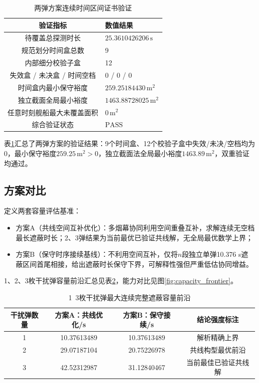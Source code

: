\documentclass[withoutpreface,bwprint]{cumcmthesis}
\renewcommand{\textbf}[1]{{\song\bfseries #1}}
\begin{document}
\begin{table}[htbp]
	\centering
	\caption{两弹方案连续时间区间证书验证}
	\label{tab:two_bomb_cert}
	\begin{tabular}{c|l}
		\hline
		\textbf{验证指标} & \textbf{数值结果} \\
		\hline
		待覆盖总探测时长 & $25.3610426206\,\text{s}$ \\
		规范划分时间盒总数 & 9 \\
		内部细分校验子盒 & 12 \\
		失效盒 / 未决盒 / 时间空档 & 0 / 0 / 0 \\
		时间盒内最小保守裕度 & $259.25184430\,\text{m}^2$ \\
		独立截面全局最小裕度 & $1463.88728025\,\text{m}^2$ \\
		任意时刻舰船最大未覆盖面积 & $0\,\text{m}^2$ \\
		综合验证状态 & $\text{PASS}$ \\
		\hline
	\end{tabular}
\end{table}


	
表\ref{tab:two_bomb_cert}汇总了两弹方案的验证结果：9个时间盒、12个校验子盒中失效/未决/空档均为0，最小保守裕度$259.25\,\text{m}^2>0$，独立截面法全局最小裕度$1463.89\,\text{m}^2$，双重验证均通过。


\subsection{方案对比}
定义两套容量评估基准：
\begin{itemize}
	\item 方案A（共线空间互补优化）：多烟幕协同利用空间重叠互补，求解连续无空档最长遮蔽时长；2、3弹结果为当前最优已验证共线解，无全局最优数学上界；
	\item 方案B（保守时序接续基线）：不利用空间互补，仅将$n$段独立单弹10.376 s遮蔽区间首尾相接，给出遮蔽时长保守下界，可解释性强但严重低估协同增益。
\end{itemize}

1、2、3枚干扰弹容量前沿汇总见表\ref{tab:capacity_frontier}，能力对比见图\ref{fig:capacity_frontier}。

\begin{table}[htbp]
	\centering
	\caption{1~3枚干扰弹最大连续完整遮蔽容量前沿}
	\label{tab:capacity_frontier}
	\begin{tabular}{c|c|c|c}
		\hline
		\textbf{干扰弹数量} & \textbf{方案A：共线优化/s} & \textbf{方案B：保守接续/s} & 结论强度标注 \\
		\hline
		1 & 10.37613489 & 10.37613489 & 解析精确上界 \\
		2 & 29.07187104 & 20.75226978 & 共线构型最优前沿 \\
		3 & 42.52312987 & 31.12840467 & 当前最佳已验证共线解 \\
		\hline
	\end{tabular}
\end{table}
\end{document}
